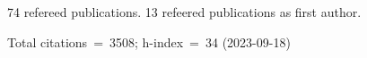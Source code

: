 74 refereed publications. 13 refeered publications as first author.

Total citations~=~3508; h-index~=~34 (2023-09-18)